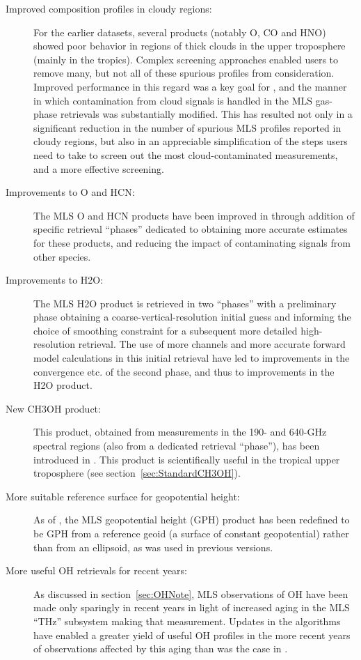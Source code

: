 \documentclass[11pt,draft]{report}
\begin{document}
\begin{description}
\item[Improved composition profiles in cloudy regions:] For the earlier
  \prevv datasets, several products (notably O, CO and HNO)
  showed poor behavior in regions of thick clouds in the upper
  troposphere (mainly in the tropics).  Complex screening approaches
  enabled users to remove many, but not all of these spurious profiles
  from consideration.  Improved performance in this regard was a key
  goal for \thisv, and the manner in which contamination from cloud
  signals is handled in the MLS gas-phase retrievals was substantially
  modified.  This has resulted not only in a significant reduction in
  the number of spurious MLS profiles reported in cloudy regions, but
  also in an appreciable simplification of the steps users need to take
  to screen out the most cloud-contaminated measurements, and a more
  effective screening.

\item[Improvements to O and HCN:] The MLS O and HCN products
  have been improved in \thisv through addition of specific retrieval
  ``phases'' dedicated to obtaining more accurate estimates for these
  products, and reducing the impact of contaminating signals from other
  species.

\item[Improvements to H\cs2O:] The MLS H\cs2O product is retrieved in
  two ``phases'' with a preliminary phase obtaining a
  coarse-vertical-resolution initial guess and informing the choice of
  smoothing constraint for a subsequent more detailed high-resolution
  retrieval.  The use of more channels and more accurate forward model
  calculations in this initial retrieval have led to improvements in the
  convergence etc. of the second phase, and thus to improvements in the
  H\cs2O product.

\item[New CH\cs3OH product:] This product, obtained from measurements in
  the 190- and 640-GHz spectral regions (also from a dedicated retrieval
  ``phase''), has been introduced in \thisv.  This product is
  scientifically useful in the tropical upper troposphere (see
  section~\ref{sec:StandardCH3OH}).

\item[More suitable reference surface for geopotential height:] As of
  \thisv, the MLS geopotential height (GPH) product has been redefined
  to be GPH from a reference geoid (a surface of constant geopotential)
  rather than from an ellipsoid, as was used in previous versions.

\item[More useful OH retrievals for recent years:] As discussed in
  section~\ref{sec:OHNote}, MLS observations of OH have been made only
  sparingly in recent years in light of increased aging in the MLS
  ``THz'' subsystem making that measurement.  Updates in the \thisv
  algorithms have enabled a greater yield of useful OH profiles in the
  more recent years of observations affected by this aging than was the
  case in \prevv.
\end{description}
\end{document}
